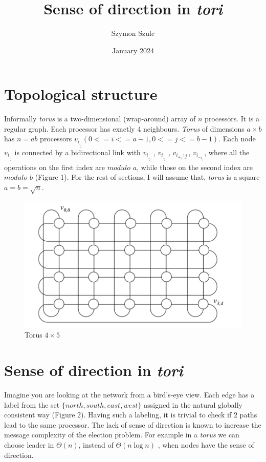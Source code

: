 \documentclass{article}
\title{Sense of direction in \textit{tori}}
\author{Szymon Szulc}
\date{January 2024}
\begin{document}
\maketitle

\section{Topological structure}
Informally \textit{torus} is a two-dimensional (wrap-around) array of $n$ processors. It is a regular graph. Each processor has exactly 4 neighbours.
\textit{Torus} of dimensions $a \times b $ has $n = ab$ processors $v_i_,_j(0 <= i <= a - 1, 0 <= j <= b - 1)$. Each node $v_i_,_j$ is connected by a bidirectional link with $v_i_,_j_+_1$, $v_i_,_j_-_1$, $v_i_+_1,_j$, 
$v_i_-_1_,_j$, where all
the operations on the first index are $\textit{modulo } a$, while those on the second index are
$\textit{modulo } b$ (Figure 1). For the rest of sections, I will assume that, \textit{torus} is a square \mbox{$a=b=\sqrt{n}$}.

\begin{figure}[h!]
\centering
\includegraphics{torus.png}
\caption{Torus $4 \times 5$ \cite{mans}}
\label{fig:torus}
\end{figure}

\newpage

\section{Sense of direction in \textit{tori}}
Imagine you are looking at the network from a bird's-eye view. Each edge has a label from the set $\{north, south, east, west\}$ assigned in the
natural globally consistent way (Figure 2). Having such a labeling, it is trivial to check if 2 paths lead to the same processor. The lack of sense of direction is known to increase the message complexity of the election problem. For example in a \textit{torus} we can choose leader in $\Theta(n)$, instead of $\Theta(n\log{}n)$ \cite{mans}, when nodes have the sense of direction.
\end{document}

